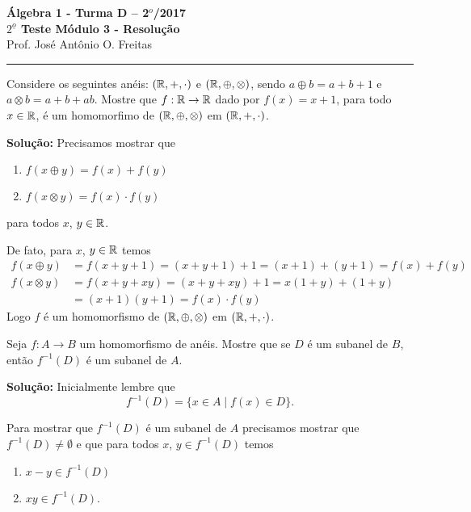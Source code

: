 \documentclass[12pt]{article}
\begin{document}


\begin{center}
{\Large\bf {\'A}lgebra 1 - Turma D -- 2$^{o}$/2017} \\ \vspace{9pt} {\large\bf
  $2^{\underline{o}}$ Teste Módulo 3 - Resolu\c{c}\~ao}\\
\vspace{9pt} Prof. Jos{\'e} Ant{\^o}nio O. Freitas
\end{center}
\hrule

\vspace{.6cm}

\questao Considere os seguintes an{\'e}is: $(\mathbb{R}, +, \cdot)$ e $(\mathbb{R}, \oplus, \otimes)$, sendo $a \oplus b = a + b + 1$ e $a \otimes b = a + b + ab$. Mostre que $f : \mathbb{R} \to \mathbb{R}$ dado por $f(x) = x + 1$, para todo $x \in \mathbb{R}$, {\'e} um homomorfimo de $(\mathbb{R}, \oplus, \otimes)$ em $(\mathbb{R}, +, \cdot)$.

\noindent\textbf{Solu\c{c}\~ao:}
Precisamos mostrar que
\begin{enumerate}[label=({\alph*})]
	\item $f(x \oplus y) = f(x) + f(y)$
	\item $f(x \otimes y) = f(x)\cdot f(y)$
\end{enumerate}
para todos $x$, $y \in \mathbb{R}$.

De fato, para $x$, $y \in \mathbb{R}$ temos
\begin{align*}
	f(x \oplus y) &= f(x + y + 1) = (x + y + 1) + 1 = (x + 1) + (y + 1) = f(x) + f(y)\\
	f(x \otimes y) &=  f(x + y + xy) = (x + y + xy) + 1 = x(1 + y) + (1 + y) \\ &= (x + 1)(y + 1) = f(x)\cdot f(y)
\end{align*}
Logo $f$ é um homomorfismo de $(\mathbb{R}, \oplus, \otimes)$ em $(\mathbb{R}, +, \cdot)$.

\vspace{.5cm}

\questao Seja $f: A \to B$ um homomorfismo de an{\'e}is. Mostre que se $D$ {\'e} um subanel de $B$, ent{\~a}o $f^{-1}(D)$ {\'e} um subanel de $A$.

\noindent\textbf{Solu\c{c}\~ao:} Inicialmente lembre que
\[
	f^{-1}(D) = \{x \in A \mid f(x) \in D\}.
\]

Para mostrar que $f^{-1}(D)$ é um subanel de $A$ precisamos mostrar que $f^{-1}(D) \ne \emptyset$ e que para todos $x$, $y \in f^{-1}(D)$ temos
\begin{enumerate}[label=({\alph*})]
	\item $x - y \in f^{-1}(D)$
	\item $xy \in f^{-1}(D)$.
\end{enumerate}
\end{document}
